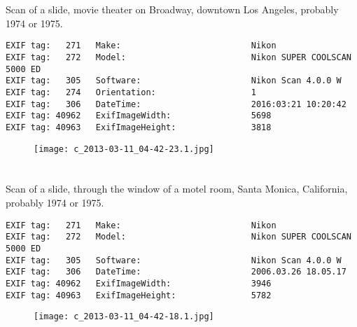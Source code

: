 \section{\protect{}}
\noindent Scan of a slide, movie theater on Broadway, downtown Los Angeles, probably 1974 or 1975.
\noindent
\begin{lstlisting}
EXIF tag:   271   Make:                          Nikon
EXIF tag:   272   Model:                         Nikon SUPER COOLSCAN 5000 ED
EXIF tag:   305   Software:                      Nikon Scan 4.0.0 W
EXIF tag:   274   Orientation:                   1
EXIF tag:   306   DateTime:                      2016:03:21 10:20:42
EXIF tag: 40962   ExifImageWidth:                5698
EXIF tag: 40963   ExifImageHeight:               3818

\end{lstlisting}
\clearpage
\begin{figure}
\raggedleft
\texttt{[image: c\_2013-03-11\_04-42-23.1.jpg]}
\end{figure}


\clearpage
\section{\protect{}}
\noindent Scan of a slide, through the window of a motel room, Santa Monica, California, probably 1974 or 1975.
\noindent
\begin{lstlisting}
EXIF tag:   271   Make:                          Nikon
EXIF tag:   272   Model:                         Nikon SUPER COOLSCAN 5000 ED
EXIF tag:   305   Software:                      Nikon Scan 4.0.0 W
EXIF tag:   306   DateTime:                      2006.03.26 18.05.17
EXIF tag: 40962   ExifImageWidth:                3946
EXIF tag: 40963   ExifImageHeight:               5782

\end{lstlisting}
\clearpage
\begin{figure}
\raggedleft
\texttt{[image: c\_2013-03-11\_04-42-18.1.jpg]}
\end{figure}


\clearpage
